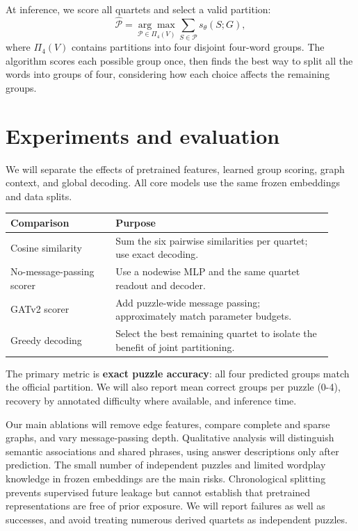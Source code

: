 \documentclass{article}
\begin{document}
At inference, we score all quartets and select a valid partition:
\begin{equation}
\widehat{\mathcal P}=\underset{\mathcal P\in\Pi_4(V)}{\arg\max}
\sum_{S\in\mathcal P}s_\theta(S;G),
\end{equation}
where $\Pi_4(V)$ contains partitions into four disjoint four-word groups. The algorithm scores each possible group once, then finds the best way to split all the words into groups of four, considering how each choice affects the remaining groups.

\section{Experiments and evaluation}
We will separate the effects of pretrained features, learned group scoring, graph context, and global decoding. All core models use the same frozen embeddings and data splits.

\begin{center}
\begin{tabular}{p{0.30\linewidth}p{0.62\linewidth}}
\toprule
\textbf{Comparison} & \textbf{Purpose} \\
\midrule
Cosine similarity & Sum the six pairwise similarities per quartet; use exact decoding. \\
No-message-passing scorer & Use a nodewise MLP and the same quartet readout and decoder. \\
GATv2 scorer & Add puzzle-wide message passing; approximately match parameter budgets. \\
Greedy decoding & Select the best remaining quartet to isolate the benefit of joint partitioning. \\
\bottomrule
\end{tabular}
\end{center}

The primary metric is \textbf{exact puzzle accuracy}: all four predicted groups match the official partition. We will also report mean correct groups per puzzle (0-4), recovery by annotated difficulty where available, and inference time.

Our main ablations will remove edge features, compare complete and sparse graphs, and vary message-passing depth. Qualitative analysis will distinguish semantic associations and shared phrases, using answer descriptions only after prediction. The small number of independent puzzles and limited wordplay knowledge in frozen embeddings are the main risks. Chronological splitting prevents supervised future leakage but cannot establish that pretrained representations are free of prior exposure. We will report failures as well as successes, and avoid treating numerous derived quartets as independent puzzles.
\end{document}
